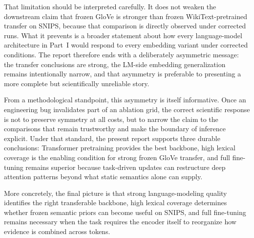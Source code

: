 \documentclass[10pt,a4paper]{article}
\begin{document}
That limitation should be interpreted carefully. It does not weaken the downstream claim that frozen GloVe is stronger than frozen WikiText-pretrained transfer on SNIPS, because that comparison is directly observed under corrected runs. What it prevents is a broader statement about how every language-model architecture in Part~I would respond to every embedding variant under corrected conditions. The report therefore ends with a deliberately asymmetric message: the transfer conclusions are strong, the LM-side embedding generalization remains intentionally narrow, and that asymmetry is preferable to presenting a more complete but scientifically unreliable story.

From a methodological standpoint, this asymmetry is itself informative. Once an engineering bug invalidates part of an ablation grid, the correct scientific response is not to preserve symmetry at all costs, but to narrow the claim to the comparisons that remain trustworthy and make the boundary of inference explicit. Under that standard, the present report supports three durable conclusions: Transformer pretraining provides the best backbone, high lexical coverage is the enabling condition for strong frozen GloVe transfer, and full fine-tuning remains superior because task-driven updates can restructure deep attention patterns beyond what static semantics alone can supply.

More concretely, the final picture is that strong language-modeling quality identifies the right transferable backbone, high lexical coverage determines whether frozen semantic priors can become useful on SNIPS, and full fine-tuning remains necessary when the task requires the encoder itself to reorganize how evidence is combined across tokens.
\end{document}
